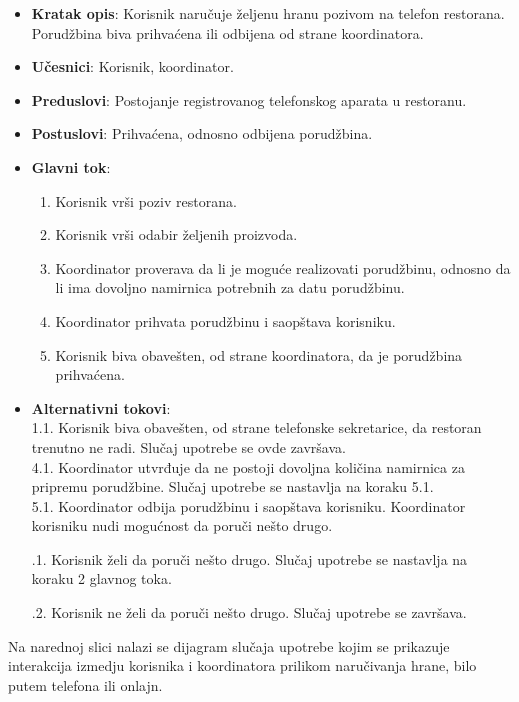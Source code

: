 \begin{itemize}
    \item \textbf{Kratak opis}: Korisnik naručuje željenu hranu pozivom na telefon restorana. Porudžbina biva prihvaćena ili odbijena od strane koordinatora.
    \item \textbf{Učesnici}: Korisnik, koordinator.
    \item \textbf{Preduslovi}: Postojanje registrovanog telefonskog aparata u restoranu.
    \item \textbf{Postuslovi}: Prihvaćena, odnosno odbijena porudžbina.
     \item \textbf{Glavni tok}:
    \begin{enumerate}
        \item Korisnik vrši poziv restorana.
        \item Korisnik vrši odabir željenih proizvoda.
        \item Koordinator proverava da li je moguće realizovati porudžbinu, odnosno
        da li ima dovoljno namirnica potrebnih za datu porudžbinu.
        \item Koordinator prihvata porudžbinu i saopštava korisniku.
        \item Korisnik biva obavešten, od strane koordinatora, da je porudžbina prihvaćena.
    \end{enumerate}
    \item \textbf{Alternativni tokovi}:\\
     1.1. Korisnik biva obavešten, od strane telefonske sekretarice, da restoran trenutno ne radi. Slučaj upotrebe se ovde završava.\\
     4.1. Koordinator utvrđuje da ne postoji dovoljna količina namirnica za pripremu porudžbine. Slučaj upotrebe se nastavlja na koraku 5.1.\\
     5.1. Koordinator odbija porudžbinu i saopštava korisniku. Koordinator korisniku nudi mogućnost da poruči nešto drugo.  
     
      .1. Korisnik želi da poruči nešto drugo. Slučaj upotrebe se nastavlja na koraku 2 glavnog toka. 
      
      .2. Korisnik ne želi da poruči nešto drugo. Slučaj upotrebe se završava. \\
    
    \end{itemize}
    
Na narednoj slici nalazi se dijagram slučaja upotrebe kojim se prikazuje interakcija izmedju korisnika i koordinatora prilikom naručivanja hrane, bilo putem telefona ili onlajn.

